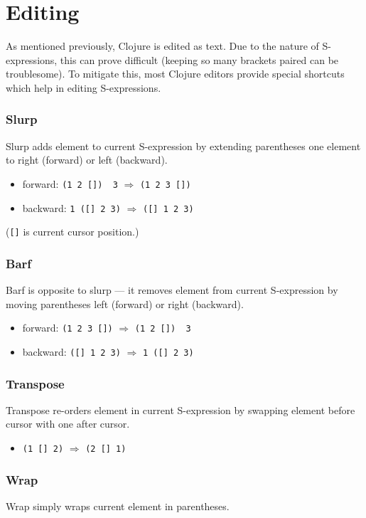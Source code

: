 \documentclass[english,mgr,shortabstract]{iithesis}
\begin{document}
\section{Editing}
\label{sec:editing}
As mentioned previously, Clojure is edited as text.
Due to the nature of S-expressions, this can prove difficult (keeping so many
brackets paired can be troublesome).
To mitigate this, most Clojure editors provide special shortcuts which help in
editing S-expressions.

\subsubsection{Slurp}
Slurp adds element to current S-expression by extending parentheses one element
to right (forward) or left (backward).

\begin{itemize}
\item forward: \lstinline|(1 2 [])  3| $\Rightarrow$ \lstinline|(1 2 3 [])|
\item backward: \lstinline|1 ([] 2 3)| $\Rightarrow$ \lstinline|([] 1 2 3)|
\end{itemize}
(\lstinline{[]} is current cursor position.)

\subsubsection{Barf}
Barf is opposite to slurp --- it removes element from current S-expression by
moving parentheses left (forward) or right (backward).
\begin{itemize}
\item forward: \lstinline|(1 2 3 [])| $\Rightarrow$ \lstinline|(1 2 [])  3|
\item backward: \lstinline|([] 1 2 3)| $\Rightarrow$ \lstinline|1 ([] 2 3)|
\end{itemize}

\subsubsection{Transpose}
Transpose re-orders element in current S-expression by swapping element before
cursor with one after cursor.
\begin{itemize}
\item \lstinline|(1 [] 2)| $\Rightarrow$ \lstinline|(2 [] 1)|
\end{itemize}

\subsubsection{Wrap}
Wrap simply wraps current element in parentheses.
\end{document}
